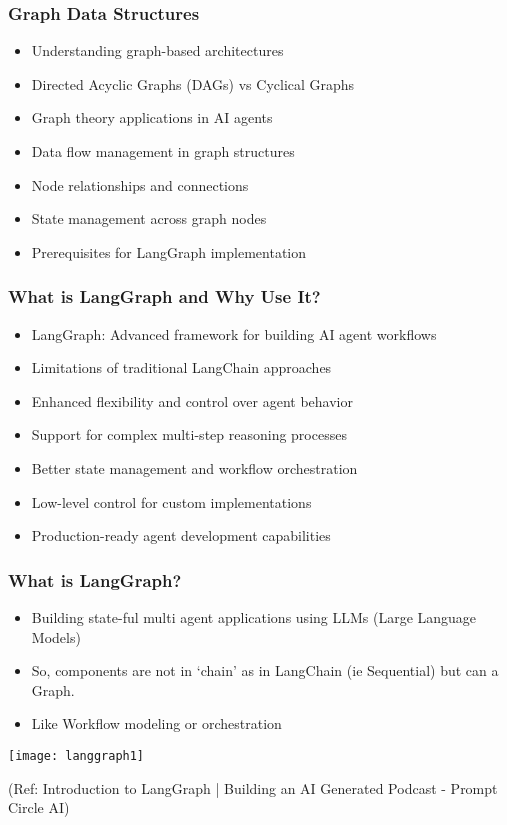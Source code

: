 \begin{frame}[fragile]\frametitle{Graph Data Structures}
      \begin{itemize}
        \item Understanding graph-based architectures
        \item Directed Acyclic Graphs (DAGs) vs Cyclical Graphs
        \item Graph theory applications in AI agents
        \item Data flow management in graph structures
        \item Node relationships and connections
        \item State management across graph nodes
        \item Prerequisites for LangGraph implementation
      \end{itemize}
\end{frame}

\begin{frame}[fragile]\frametitle{What is LangGraph and Why Use It?}
      \begin{itemize}
        \item LangGraph: Advanced framework for building AI agent workflows
        \item Limitations of traditional LangChain approaches
        \item Enhanced flexibility and control over agent behavior
        \item Support for complex multi-step reasoning processes
        \item Better state management and workflow orchestration
        \item Low-level control for custom implementations
        \item Production-ready agent development capabilities
      \end{itemize}
\end{frame}

\begin{frame}\frametitle{What is LangGraph?}

\begin{itemize}
\item Building state-ful multi agent applications using LLMs (Large Language Models)
\item So, components are not in `chain' as in LangChain (ie Sequential) but can a Graph.
\item Like Workflow modeling or orchestration
\end{itemize}

\begin{center}
\texttt{[image: langgraph1]}
\end{center}	  


{\tiny (Ref: Introduction to LangGraph | Building an AI Generated Podcast - Prompt Circle AI)}
\end{frame}

